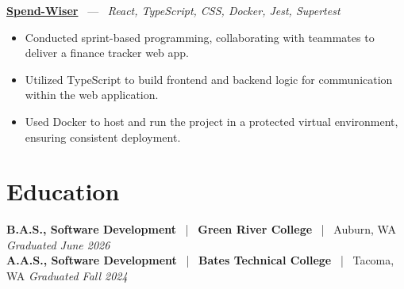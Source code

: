 \documentclass[10pt, letterpaper]{article}
\newcommand{\jobhead}[4]{%
  \vspace{5pt}%
  {\bfseries\color{dark}#1}%
  ~{\color{light}|}~%
  {\bfseries\color{navy}#2}%
  ~{\color{light}|}~%
  {\color{light}#3}%
  \hfill{\color{light}\small\textit{#4}}\\[-2pt]%
}
\newcommand{\projhead}[3]{%
  \vspace{5pt}%
  {\bfseries\color{dark}\href{#2}{#1}}%
  ~{\color{light}---}~%
  {\color{light}\small\textit{#3}}\\[-2pt]%
}
\begin{document}
\projhead{Spend-Wiser}{https://github.com/JesseChum/w26-sdev372-spendwiser-finance-tracker}{React, TypeScript, CSS, Docker, Jest, Supertest}
\begin{itemize}
  \item Conducted sprint-based programming, collaborating with teammates to deliver a finance tracker web app.
  \item Utilized TypeScript to build frontend and backend logic for communication within the web application.
  \item Used Docker to host and run the project in a protected virtual environment, ensuring consistent deployment.
\end{itemize}

\section{Education}

\jobhead{B.A.S., Software Development}{Green River College}{Auburn, WA}{Graduated June 2026}
\jobhead{A.A.S., Software Development}{Bates Technical College}{Tacoma, WA}{Graduated Fall 2024}
\end{document}
